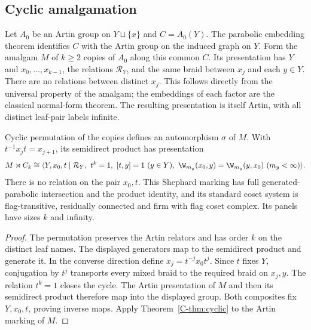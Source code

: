 \subsection{Cyclic amalgamation}
Let $A_0$ be an Artin group on $Y\sqcup\{x\}$ and
$C=A_0(Y)$. The parabolic embedding theorem identifies $C$ with the
Artin group on the induced graph on $Y$. Form the amalgam $M$ of
$k\geq2$ copies of $A_0$ along this common $C$. Its presentation has
$Y$ and $x_0,\ldots,x_{k-1}$, the relations $\mathcal R_Y$, and the
same braid between $x_j$ and each $y\in Y$. There are no relations
between distinct $x_j$. This follows directly from the universal
property of the amalgam; the embeddings of each factor are the
classical normal-form theorem. The resulting presentation is itself
Artin, with all distinct leaf-pair labels infinite.

\begin{theorem}\label{C-thm:amalgam}
Cyclic permutation of the copies defines an automorphism $\sigma$ of
$M$. With $t^{-1}x_jt=x_{j+1}$, its semidirect product has presentation
\[
 M\rtimes C_k\cong
 \langle Y,x_0,t\mid\mathcal R_Y,\ t^k=1,\ [t,y]=1\ (y\in Y),\
 \W_{m_y}(x_0,y)=\W_{m_y}(y,x_0)\ (m_y<\infty)\rangle.
\]
There is no relation on the pair $x_0,t$. This Shephard marking has
full generated-parabolic intersection and the product identity,
and its standard coset system is flag-transitive, residually connected
and firm with flag coset complex. Its panels have sizes $k$ and
infinity.
\end{theorem}
\begin{proof}
The permutation preserves the Artin relators and has order $k$ on
the distinct leaf names. The displayed generators map to the
semidirect product and generate it. In the converse direction define
$x_j=t^{-j}x_0t^j$. Since $t$ fixes $Y$, conjugation by $t^j$
transports every mixed braid to the required braid on $x_j,y$.
The relation $t^k=1$ closes the cycle. The Artin presentation of
$M$ and then its semidirect product therefore map into the displayed
group. Both composites fix $Y,x_0,t$, proving inverse maps. Apply
Theorem~\ref{C-thm:cyclic} to the Artin marking of $M$.
\end{proof}
